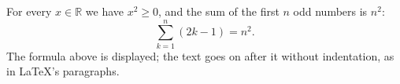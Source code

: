 \newcommand{\R}{\mathbb{R}}
For every $x \in \R$ we have $x^2 \ge 0$, and the sum of the first $n$ odd numbers is
\( n^2 \): \[ \sum_{k=1}^{n} (2k - 1) = n^2 . \] The formula above is displayed; the text goes
on after it without indentation, as in LaTeX's paragraphs.

